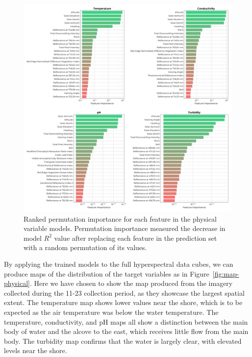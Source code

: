 \documentclass[remotesensing,article,submit,pdftex,moreauthors]{Definitions/mdpi}
\begin{document}
\begin{figure}
\centering
\includegraphics[width=\columnwidth]{paper/figures/results/fits/physical-ranking.pdf}
\caption{Ranked permutation importance for each feature in the physical variable models. Permutation importance measured the decrease in model $R^2$ value after replacing each feature in the prediction set with a random permutation of its values.\label{fig:physical-fi}}
\end{figure}  

By applying the trained models to the full hyperspectral data cubes, we can produce maps of the distribution of the target variables as in Figure~\ref{fig:map-physical}. Here we have chosen to show the map produced from the imagery collected during the 11-23 collection period, as they showcase the largest spatial extent. The temperature map shows lower values near the shore, which is to be expected as the air temperature was below the water temperature. The temperature, conductivity, and pH maps all show a distinction between the main body of water and the alcove to the east, which receives little flow from the main body. The turbidity map confirms that the water is largely clear, with elevated levels near the shore.
\end{document}
